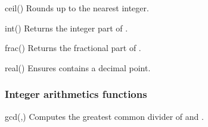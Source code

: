 \begin{math-function}{ceil()}
\mathcommand
    Rounds  up to the nearest integer.
\begin{codeexample}[]
 \pgfmathresult
\end{codeexample}

\begin{codeexample}[]
 \pgfmathresult
\end{codeexample}

\begin{codeexample}[]
 \pgfmathresult
\end{codeexample}
\end{math-function}

\begin{math-function}{int()}
\mathcommand
    Returns the integer part of .
\begin{codeexample}[]
 \pgfmathresult
\end{codeexample}
\end{math-function}

\begin{math-function}{frac()}
\mathcommand
    Returns the fractional part of .
\begin{codeexample}[]
 \pgfmathresult
\end{codeexample}
\end{math-function}

\begin{math-function}{real()}
\mathcommand
    Ensures  contains a decimal point.
\begin{codeexample}[]
 \pgfmathresult
\end{codeexample}
\end{math-function}


\subsubsection{Integer arithmetics functions}
\label{pgfmath-functions-integerarithmetics}

\begin{math-function}{gcd(,)}
\mathcommand
    Computes the greatest common divider of  and .
\begin{codeexample}[]
 \pgfmathresult
\end{codeexample}
\end{math-function}

